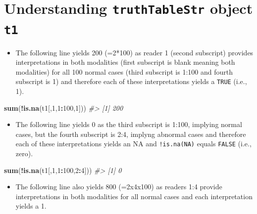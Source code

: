 \documentclass[]{book}
\newenvironment{Shaded}{\begin{snugshade}}{\end{snugshade}}
\newcommand{\CommentTok}[1]{\textcolor[rgb]{0.56,0.35,0.01}{\textit{#1}}}
\newcommand{\DecValTok}[1]{\textcolor[rgb]{0.00,0.00,0.81}{#1}}
\newcommand{\KeywordTok}[1]{\textcolor[rgb]{0.13,0.29,0.53}{\textbf{#1}}}
\newcommand{\NormalTok}[1]{#1}
\newcommand{\OperatorTok}[1]{\textcolor[rgb]{0.81,0.36,0.00}{\textbf{#1}}}
\providecommand{\tightlist}{%
  \setlength{\itemsep}{0pt}\setlength{\parskip}{0pt}}
\begin{document}
\hypertarget{understanding-truthtablestr-object-t1}{%
\section{\texorpdfstring{Understanding \texttt{truthTableStr} object \texttt{t1}}{Understanding truthTableStr object t1}}\label{understanding-truthtablestr-object-t1}}

\begin{itemize}
\tightlist
\item
  The following line yields 200 (=2*100) as reader 1 (second subscript) provides interpretations in both modalities (first subscript is blank meaning both modalities) for all 100 normal cases (third subscript is 1:100 and fourth subscript is 1) and therefore each of these interpretations yields a \texttt{TRUE} (i.e., 1).
\end{itemize}

\begin{Shaded}
\begin{Highlighting}[]
\KeywordTok{sum}\NormalTok{(}\OperatorTok{!}\KeywordTok{is.na}\NormalTok{(t1[,}\DecValTok{1}\NormalTok{,}\DecValTok{1}\OperatorTok{:}\DecValTok{100}\NormalTok{,}\DecValTok{1}\NormalTok{]))}
\CommentTok{#> [1] 200}
\end{Highlighting}
\end{Shaded}

\begin{itemize}
\tightlist
\item
  The following line yields 0 as the third subscript is 1:100, implying normal cases, but the fourth subscript is 2:4, implyng abnormal cases and therefore each of these interpretations yields an NA and \texttt{!is.na(NA)} equals \texttt{FALSE} (i.e., zero).
\end{itemize}

\begin{Shaded}
\begin{Highlighting}[]
\KeywordTok{sum}\NormalTok{(}\OperatorTok{!}\KeywordTok{is.na}\NormalTok{(t1[,}\DecValTok{1}\NormalTok{,}\DecValTok{1}\OperatorTok{:}\DecValTok{100}\NormalTok{,}\DecValTok{2}\OperatorTok{:}\DecValTok{4}\NormalTok{]))}
\CommentTok{#> [1] 0}
\end{Highlighting}
\end{Shaded}

\begin{itemize}
\tightlist
\item
  The following line also yields 800 (=2x4x100) as readers 1:4 provide interpretations in both modalities for all normal cases and each interpretation yields a 1.
\end{itemize}
\end{document}
